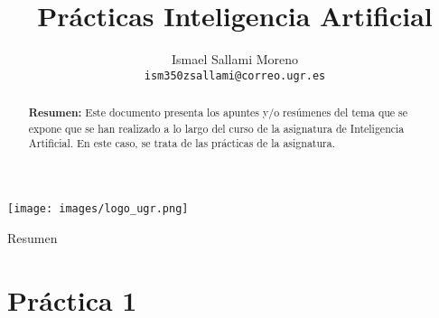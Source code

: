 \documentclass[a4paper,12pt]{article}
\title{\textbf{Prácticas Inteligencia Artificial}}
\author{
    Ismael Sallami Moreno \\
    \texttt{ism350zsallami@correo.ugr.es}
}
\date{
    \vspace{1cm}
    \begin{tabular}{rl}
        \textbf{Asignatura:} & Inteligencia Artificial \\
        \textbf{Tema:} & Prácticas \\
        \textbf{Fecha:} & \today
    \end{tabular}
}
\begin{document}
\maketitle
\begin{center}
    \texttt{[image: images/logo\_ugr.png]}
\end{center}
\newpage

Resumen
\begin{abstract}
\noindent
\textbf{Resumen:} Este documento presenta los apuntes y/o resúmenes del tema que se expone que se han realizado a lo largo del curso de la asignatura de Inteligencia Artificial. En este caso, se trata de las prácticas de la asignatura.
\end{abstract}
\bigskip



\tableofcontents
\newpage

\section{Práctica 1}
\end{document}
